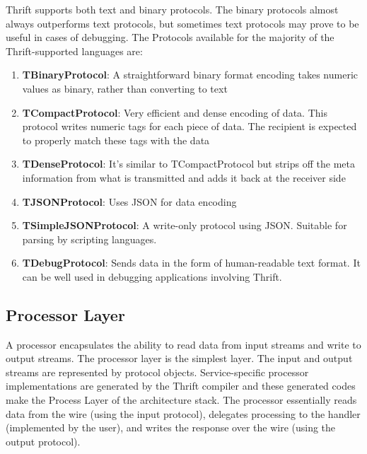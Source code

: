 \documentclass[9pt,twocolumn,twoside]{../../styles/osajnl}
\begin{document}
Thrift supports both text and binary protocols. The binary protocols almost always outperforms text protocols, but sometimes text protocols may prove to be useful in cases of debugging. The Protocols available for the majority of the Thrift-supported languages are:
\begin{enumerate}
	\item \textbf{TBinaryProtocol}: A straightforward binary format encoding takes numeric values as binary, rather than converting to text
	\item \textbf{TCompactProtocol}: Very efficient and dense encoding of data. This protocol writes numeric tags for each piece of data. The recipient is expected to properly match these tags with the data
	\item \textbf{TDenseProtocol}: It’s similar to TCompactProtocol but strips off the meta information from what is transmitted and adds it back at the receiver side
	\item \textbf{TJSONProtocol}: Uses JSON for data encoding
	\item \textbf{TSimpleJSONProtocol}: A write-only protocol using JSON. Suitable for parsing by scripting languages.
	\item \textbf{TDebugProtocol}: Sends data in the form of human-readable text format. It can be well used in debugging applications involving Thrift.
\end{enumerate}


\subsection{Processor Layer}
A processor encapsulates the ability to read data from input streams and write to output streams. The processor layer is the simplest layer. The input and output streams are represented by protocol objects. Service-specific processor implementations are generated by the Thrift compiler and these generated codes make the Process Layer of the architecture stack. The processor essentially reads data from the wire (using the input protocol), delegates processing to the handler (implemented by the user), and writes the response over the wire (using the output protocol).

	
\end{document}
